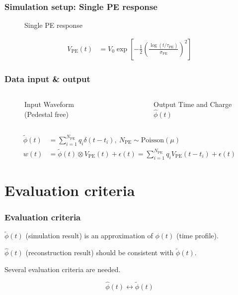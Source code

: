 \documentclass{beamer}
\begin{document}
\begin{CJK*}{UTF8}{gbsn}
\begin{frame}
\frametitle{Simulation setup: Single PE response}
\begin{figure}
    \centering
    \resizebox{0.6\textwidth}{!}{}
    \caption{Single PE response\cite{jetter_pmt_2012}}
\end{figure}
\begin{align*}
  V_\mathrm{PE}(t) &= V_{0}\exp\left[-\frac{1}{2}\left(\frac{\log(t/\tau_\mathrm{PE})}{\sigma_\mathrm{PE}}\right)^{2}\right]
\end{align*}
\end{frame}

\begin{frame}
\frametitle{Data input \& output}
\begin{columns}
\begin{figure}
    \centering
    \resizebox{1.0\textwidth}{!}{}
    \caption{Input Waveform (Pedestal free)}
\end{figure}
\begin{figure}
    \centering
    \resizebox{1.0\textwidth}{!}{}
    \caption{Output Time and Charge $\hat\phi(t)$}
\end{figure}
\end{columns}
\begin{align*}
  \tilde{\phi}(t) &= \sum_{i=1}^{N_{\mathrm{PE}}} q_i \delta(t-t_i), \ N_{\mathrm{PE}}\sim \mathrm{Poisson}(\mu) \\
  w(t) &= \tilde{\phi}(t) \otimes V_\mathrm{PE}(t) + \epsilon(t) = \sum_{i=1}^{N_\mathrm{PE}} q_i V_\mathrm{PE}(t-t_i) + \epsilon(t)
\end{align*}
\end{frame}

\section{Evaluation criteria}

\begin{frame}
\frametitle{Evaluation criteria}
$\tilde{\phi}(t)$ (simulation result) is an approximation of $\phi(t)$ (time profile). 

$\hat{\phi}(t)$ (reconstruction result) should be consistent with $\tilde{\phi}(t)$. 

Several evaluation criteria are needed. 
\begin{block}{}
\begin{equation*}
    \hat{\phi}(t) \leftrightarrow \tilde{\phi}(t)
\end{equation*}
\end{block}
\end{frame}


\end{CJK*}
\end{document}

